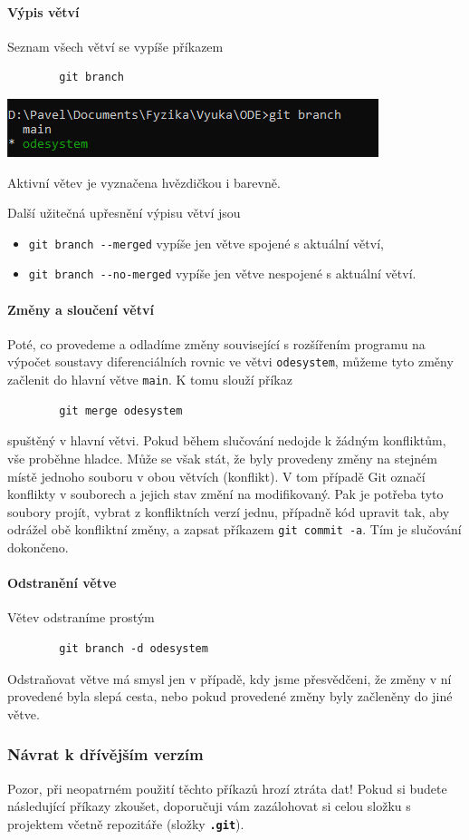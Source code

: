 \documentclass[a4paper,11pt,twoside]{article}
\newcommand{\subsubsubsection}[1]{\paragraph{#1}\mbox{}

}
\def\code#1{\textnormal{\texttt{#1}}}
\def\file#1{\textnormal{\textbf{\texttt{#1}}}}
\theoremstyle{red}
\theoremstyle{green}
\begin{document}
\subsubsubsection{Výpis větví}
    Seznam všech větví se vypíše příkazem
    \begin{lstlisting}
        git branch\end{lstlisting}
    \begin{center}\includegraphics[width=0.45\linewidth]{GitBranch.png}\end{center}
    Aktivní větev je vyznačena hvězdičkou i barevně.

    Další užitečná upřesnění výpisu větví jsou
    \begin{itemize}
        \item \code{git branch -{}-merged} vypíše jen větve spojené s aktuální větví,
        \item \code{git branch -{}-no-merged} vypíše jen větve nespojené s aktuální větví.
    \end{itemize}

\subsubsubsection{Změny a sloučení větví}
    Poté, co provedeme a odladíme změny související s rozšířením programu na výpočet soustavy diferenciálních rovnic ve větvi \code{odesystem}, můžeme tyto změny začlenit do hlavní větve \code{main}.
    K tomu slouží příkaz
    \begin{lstlisting}
        git merge odesystem\end{lstlisting}
    spuštěný v hlavní větvi.
    Pokud během slučování nedojde k žádným konfliktům, vše proběhne hladce.
    Může se však stát, že byly provedeny změny na stejném místě jednoho souboru v obou větvích (konflikt).
    V tom případě Git označí konflikty v souborech a jejich stav změní na modifikovaný.
    Pak je potřeba tyto soubory projít, vybrat z konfliktních verzí jednu, případně kód upravit tak, aby odrážel obě konfliktní změny, a zapsat příkazem \code{git commit -a}.
    Tím je slučování dokončeno.    
    
\subsubsubsection{Odstranění větve}
    Větev odstraníme prostým
    \begin{lstlisting}
        git branch -d odesystem\end{lstlisting}
    Odstraňovat větve má smysl jen v případě, kdy jsme přesvědčeni, že změny v ní provedené byla slepá cesta, nebo pokud provedené změny byly začleněny do jiné větve.

\subsubsection{Návrat k dřívějším verzím}
    {\color{red} Pozor, při neopatrném použití těchto příkazů hrozí ztráta dat!}
    Pokud si budete následující příkazy zkoušet, doporučuji vám zazálohovat si celou složku s projektem včetně repozitáře (složky \file{.git}).
\end{document}
